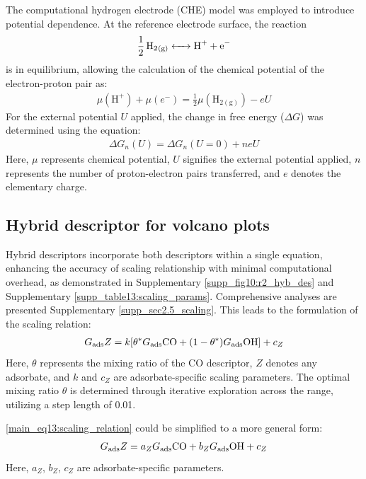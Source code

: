 \documentclass[a4paper, 12pt, titlepage]{article}
\begin{document}
    The computational hydrogen electrode (CHE) model \cite{peterson2010copper, norskov2004origin} was employed to introduce potential dependence.
    At the reference electrode surface, the reaction
    \begin{align}
    \ce{1/2H2_{(g)}  <-> H+ + e-}  \label{main_eq10:che}
    \end{align}
    is in equilibrium, allowing the calculation of the chemical potential of the electron-proton pair as:
    \begin{align}
    \mu(\mathrm{H}^+) + \mu(e^-) = \frac{1}{2}\mu(\mathrm{H}_{2(\mathrm{g})}) - eU  \label{main_eq11:che_potential}
    \end{align}
    For the external potential $\textit{U}$ applied, the change in free energy ($\Delta \textit{G}$) was determined using the equation:
    \begin{align}
    \Delta G_n(U) = \Delta G_n(U=0) + neU  \label{main_eq12:ext_potential_che}
    \end{align}
    Here, $\mu$ represents chemical potential, $\textit{U}$ signifies the external potential applied, $\textit{n}$ represents the number of proton-electron pairs transferred, and $\textit{e}$ denotes the elementary charge.


    \subsection{Hybrid descriptor for volcano plots}
    Hybrid descriptors incorporate both descriptors within a single equation, enhancing the accuracy of scaling relationship with minimal computational overhead, as demonstrated in Supplementary \cref{supp_fig10:r2_hyb_des} and Supplementary \cref{supp_table13:scaling_params}.
    Comprehensive analyses are presented Supplementary \cref{supp_sec2.5_scaling}. This leads to the formulation of the scaling relation:
    \begin{align}
    G_{\text{ads}} Z =
    k[\theta^* G_{\text{ads}} \ce{CO} + (1-\theta^*) G_{\text{ads}} \ce{OH}] + c_Z  \label{main_eq13:scaling_relation}
    \end{align}
    Here, $\theta$ represents the mixing ratio of the CO descriptor, $\textit{Z}$ denotes any adsorbate, and $\textit{k}$ and $\textit{c}_{Z}$ are adsorbate-specific scaling parameters.
    The optimal mixing ratio $\theta$ is determined through iterative exploration across the range, utilizing a step length of 0.01.

    \ref{main_eq13:scaling_relation} could be simplified to a more general form:
    \begin{align}
    G_{\text{ads}} Z =
    a_Z G_{\text{ads}} \ce{CO} + b_Z G_{\text{ads}} \ce{OH} + c_Z  \label{main_eq14:general_scaling_relation}
    \end{align}
    Here, $a_Z$, $b_Z$, $c_Z$ are adsorbate-specific parameters.
\end{document}
